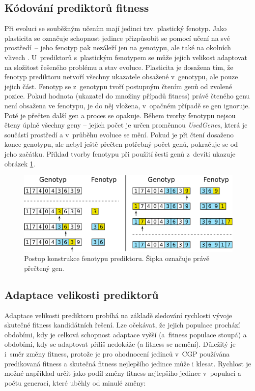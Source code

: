 \documentclass[czech]{ExcelAtFIT} %
\begin{document}
\subsection{Kódování prediktorů fitness}

 Při evoluci se souběžným učením mají jedinci tzv. plas\-tický fenotyp. Jako plasticita se označuje schopnost jedince přizpůsobit se pomocí učení na své prostředí~-- jeho fenotyp pak nezáleží jen na genotypu, ale také na okolních vlivech \cite{EllefsenBalancing}. U~prediktorů s~plastickým fenotypem se může jejich velikost adaptovat na složitost řešeného problému a stav evoluce. Plasticita je dosažena tím, že fenotyp prediktoru netvoří všechny ukazatele obsažené v~genotypu, ale pouze jejich část. Fenotyp se z~genotypu tvoří postupným čtením genů od zvolené pozice. Pokud hodnota (ukazatel do množiny případů fitness) právě čteného genu není obsažena ve fenotypu, je do něj vložena, v~opačném případě se gen ignoruje. Poté je přečten další gen a proces se opakuje. Během tvorby fenotypu nejsou čteny úplně všechny geny -- jejich počet je určen proměnnou \emph{UsedGenes}, která je součástí prostředí a v~průběhu evoluce se mění. Pokud je při čtení dosaženo konce genotypu, ale nebyl ještě přečten potřebný počet genů, pokračuje se od jeho začátku. Příklad tvorby fenotypu při použití šesti genů z~devíti ukazuje obrázek \ref{fig:PhenotypeContruction}.

\begin{figure}[hb]
    \centering\includegraphics[width=\linewidth]{images/phenotype2.pdf}
    \caption{Postup konstrukce fenotypu prediktoru. Šipka označuje právě přečtený gen.}
    \label{fig:PhenotypeContruction}
\end{figure}

\subsection{Adaptace velikosti prediktorů}

Adaptace velikosti prediktoru probíhá na základě sledování rychlosti vývoje skutečné fitness kan\-di\-dát\-ních ře\-šení. Lze očekávat, že jejich populace prochází ob\-do\-bími, kdy je celková schopnost adaptace vyšší (a~fitness populace stoupá) a obdobími, kdy se adaptovat příliš nedokáže (a fitness se nemění). Důležitý je i~směr změny fitness, protože je pro ohodnocení je\-dinců v~CGP používána predikovaná fitness a skutečná fitness nejlepšího jedince může i klesat. Rychlost je možné například určit jako podíl změny fitness nej\-lep\-šího jedince v~populaci a počtu generací, které uběhly od minulé změny:
\end{document}
